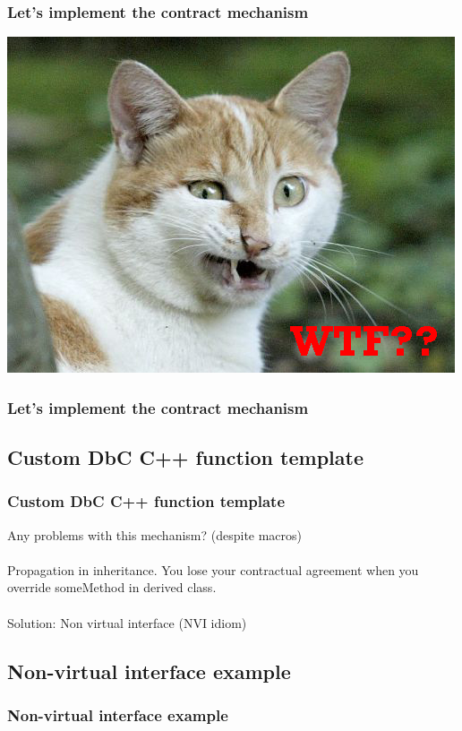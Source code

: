 \documentclass{beamer}
\begin{document}
\begin{frame}
\frametitle{Let's implement the contract mechanism}
\begin{center}
\includegraphics[scale=0.5]{cat_wtf}
\end{center}
\end{frame}

\begin{frame}[fragile]
\frametitle{Let's implement the contract mechanism}

\end{frame}

\subsection{Custom DbC C++ function template}
\begin{frame}[fragile]
\frametitle{Custom DbC C++ function template}

\pause
Any problems with this mechanism? (despite macros) \\~\\
\pause
Propagation in inheritance. You lose your contractual agreement when you override someMethod in derived class. \\~\\
\pause
Solution: Non virtual interface (NVI idiom)
\end{frame}

\subsection{Non-virtual interface example}
\begin{frame}[fragile]
\frametitle{Non-virtual interface example}

\end{frame}
\end{document}

